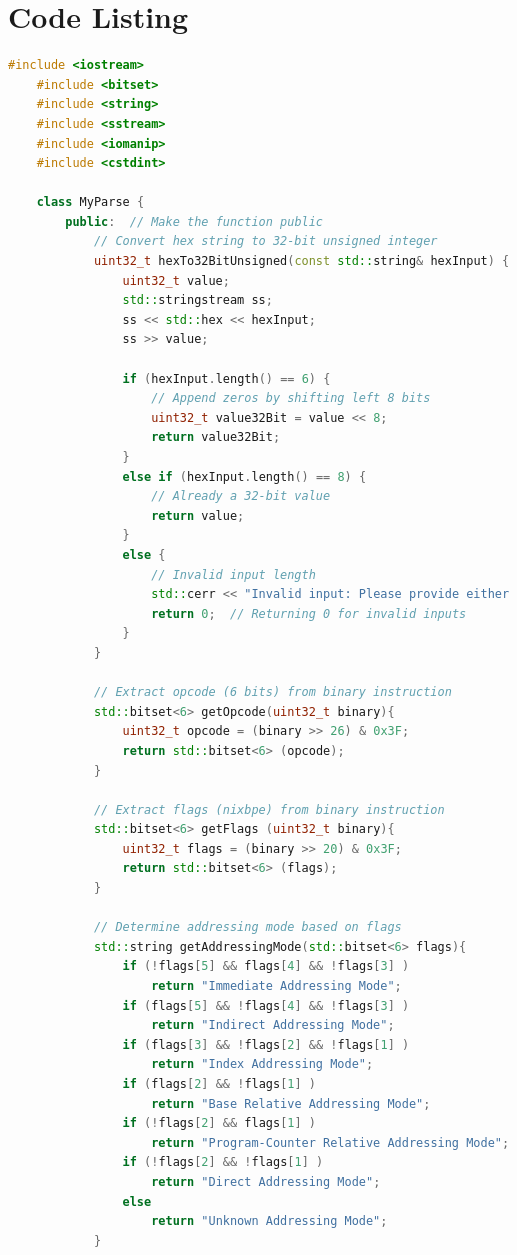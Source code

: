 \documentclass[12pt]{article}
\begin{document}
\section{Code Listing}
\begin{lstlisting}[language=C++,caption={SIC Instruction Parser in C++}]
    #include <iostream>
    #include <bitset>
    #include <string>
    #include <sstream>
    #include <iomanip>
    #include <cstdint>
    
    class MyParse {
        public:  // Make the function public
            // Convert hex string to 32-bit unsigned integer
            uint32_t hexTo32BitUnsigned(const std::string& hexInput) {
                uint32_t value;
                std::stringstream ss;
                ss << std::hex << hexInput;
                ss >> value;
    
                if (hexInput.length() == 6) {
                    // Append zeros by shifting left 8 bits
                    uint32_t value32Bit = value << 8;
                    return value32Bit;
                } 
                else if (hexInput.length() == 8) {
                    // Already a 32-bit value
                    return value;
                } 
                else {
                    // Invalid input length
                    std::cerr << "Invalid input: Please provide either 6 or 8 hexadecimal digits." << std::endl;
                    return 0;  // Returning 0 for invalid inputs
                }
            }
    
            // Extract opcode (6 bits) from binary instruction
            std::bitset<6> getOpcode(uint32_t binary){
                uint32_t opcode = (binary >> 26) & 0x3F;
                return std::bitset<6> (opcode);
            }
    
            // Extract flags (nixbpe) from binary instruction
            std::bitset<6> getFlags (uint32_t binary){
                uint32_t flags = (binary >> 20) & 0x3F;
                return std::bitset<6> (flags);
            }
            
            // Determine addressing mode based on flags
            std::string getAddressingMode(std::bitset<6> flags){
                if (!flags[5] && flags[4] && !flags[3] )
                    return "Immediate Addressing Mode";
                if (flags[5] && !flags[4] && !flags[3] )
                    return "Indirect Addressing Mode";
                if (flags[3] && !flags[2] && !flags[1] )
                    return "Index Addressing Mode";
                if (flags[2] && !flags[1] )
                    return "Base Relative Addressing Mode";
                if (!flags[2] && flags[1] )
                    return "Program-Counter Relative Addressing Mode";
                if (!flags[2] && !flags[1] )
                    return "Direct Addressing Mode";
                else
                    return "Unknown Addressing Mode";	
            }
    

\end{lstlisting}
\end{document}
